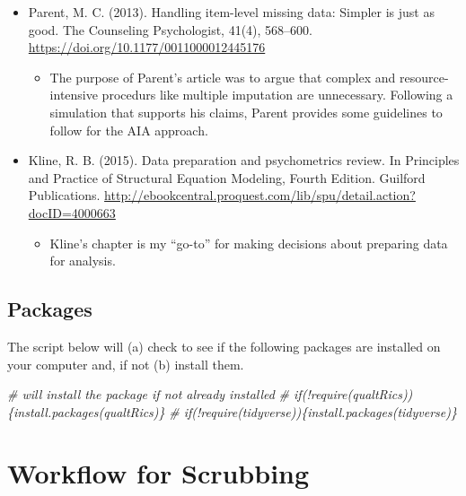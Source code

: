 \documentclass[
  11pt,
]{book}
\newenvironment{Shaded}{\begin{snugshade}}{\end{snugshade}}
\newcommand{\CommentTok}[1]{\textcolor[rgb]{0.37,0.37,0.37}{\textit{#1}}}
\providecommand{\tightlist}{%
  \setlength{\itemsep}{0pt}\setlength{\parskip}{0pt}}
\begin{document}
\begin{itemize}
\tightlist
\item
  Parent, M. C. (2013). Handling item-level missing data: Simpler is just as good. The Counseling Psychologist, 41(4), 568--600. \url{https://doi.org/10.1177/0011000012445176}

  \begin{itemize}
  \tightlist
  \item
    The purpose of Parent's article was to argue that complex and resource-intensive procedurs like multiple imputation are unnecessary. Following a simulation that supports his claims, Parent provides some guidelines to follow for the AIA approach.
  \end{itemize}
\item
  Kline, R. B. (2015). Data preparation and psychometrics review. In Principles and Practice of Structural Equation Modeling, Fourth Edition. Guilford Publications. \url{http://ebookcentral.proquest.com/lib/spu/detail.action?docID=4000663}

  \begin{itemize}
  \tightlist
  \item
    Kline's chapter is my ``go-to'' for making decisions about preparing data for analysis.
  \end{itemize}
\end{itemize}

\hypertarget{packages}{%
\subsection{Packages}\label{packages}}

The script below will (a) check to see if the following packages are installed on your computer and, if not (b) install them.

\begin{Shaded}
\begin{Highlighting}[]
\CommentTok{\# will install the package if not already installed}
\CommentTok{\# if(!require(qualtRics))\{install.packages(\textquotesingle{}qualtRics\textquotesingle{})\}}
\CommentTok{\# if(!require(tidyverse))\{install.packages(\textquotesingle{}tidyverse\textquotesingle{})\}}
\end{Highlighting}
\end{Shaded}

\hypertarget{workflow-for-scrubbing}{%
\section{Workflow for Scrubbing}\label{workflow-for-scrubbing}}
\end{document}
